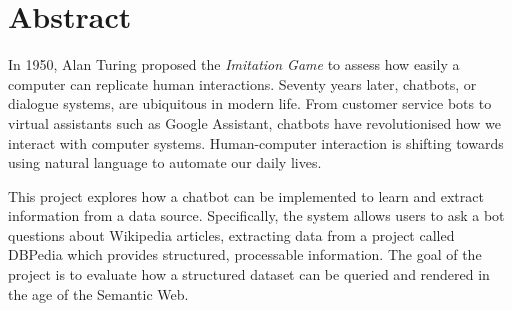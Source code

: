 \chapter*{Abstract}
In 1950, Alan Turing proposed the {\it Imitation Game} to assess how easily a computer can replicate human interactions. Seventy years later, chatbots, or dialogue systems, are ubiquitous in modern life. From customer service bots to virtual assistants such as Google Assistant, chatbots have revolutionised how we interact with computer systems. Human-computer interaction is shifting towards using natural language to automate our daily lives.

This project explores how a chatbot can be implemented to learn and extract information from a data source. Specifically, the system allows users to ask a bot questions about Wikipedia articles, extracting data from a project called DBPedia which provides structured, processable information. The goal of the project is to evaluate how a structured dataset can be queried and rendered in the age of the Semantic Web.